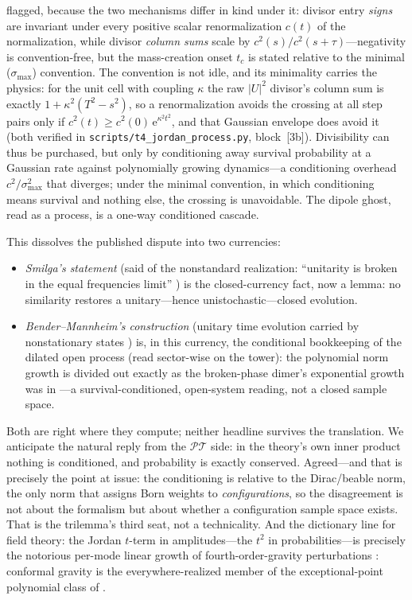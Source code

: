 \documentclass[11pt]{article}
\theoremstyle{definition}
\theoremstyle{remark}
\newcommand{\PT}{\mathcal{PT}}
\newcommand{\ee}{\mathrm{e}}
\begin{document}
flagged, because the two mechanisms differ in kind under it:
divisor entry \emph{signs} are invariant under every positive
scalar renormalization $c(t)$ of the normalization, while divisor
\emph{column sums} scale by $c^{2}(s)/c^{2}(s+\tau)$---negativity
is convention-free, but the mass-creation onset $t_c$ is stated
relative to the minimal ($\sigma_{\max}$) convention. The
convention is not idle, and its minimality carries the physics: for
the unit cell with coupling $\kappa$ the raw $|U|^{2}$ divisor's
column sum is exactly $1+\kappa^{2}(T^{2}-s^{2})$, so a
renormalization avoids the crossing at all step pairs only if
$c^{2}(t)\ge c^{2}(0)\,\ee^{\kappa^{2}t^{2}}$, and that Gaussian
envelope does avoid it (both verified in
\texttt{scripts/t4\_jordan\_process.py}, block~[3b]). Divisibility can thus
be purchased, but only by conditioning away survival probability at
a Gaussian rate against polynomially growing dynamics---a
conditioning overhead $c^{2}/\sigma_{\max}^{2}$ that diverges;
under the minimal convention, in which conditioning means survival
and nothing else, the crossing is unavoidable. The dipole ghost,
read as a process, is a one-way
conditioned cascade.

This dissolves the published dispute into two currencies:

\begin{itemize}
\item \emph{Smilga's statement} (said of the nonstandard
realization: ``unitarity is broken in the equal frequencies limit''
\cite{Smilga2008}) is the closed-currency fact,
now a lemma: no similarity restores a unitary---hence
unistochastic---closed evolution.
\item \emph{Bender--Mannheim's construction} (unitary time evolution
carried by nonstationary states \cite{BenderMannheim2008PRD}) is,
in this currency, the conditional bookkeeping of the dilated open
process (read sector-wise on the tower): the polynomial norm growth is
divided out exactly as the
broken-phase dimer's exponential growth was in \cite{indivisible}---a
survival-conditioned, open-system reading, not a closed sample
space.
\end{itemize}

Both are right where they compute; neither headline survives the
translation. We anticipate the natural reply from the $\PT$ side:
in the theory's own inner product nothing is conditioned, and
probability is exactly conserved. Agreed---and that is precisely
the point at issue: the conditioning is relative to the
Dirac/beable norm, the only norm that assigns Born weights to
\emph{configurations}, so the disagreement is not about the
formalism but about whether a configuration sample space exists.
That is the trilemma's third seat, not a technicality. And the dictionary line for field theory: the Jordan
$t$-term in amplitudes---the $t^{2}$ in probabilities---is precisely
the notorious per-mode linear growth of fourth-order-gravity
perturbations \cite{HellLustZoupanos2023}: conformal
gravity is the
everywhere-realized member of the exceptional-point polynomial class
of \cite{indivisible}.
\end{document}
